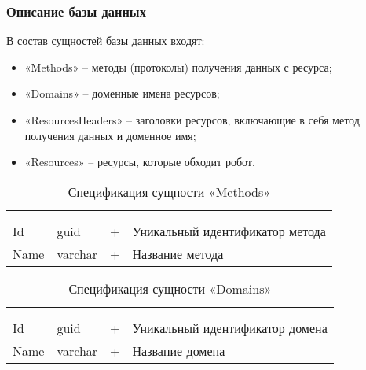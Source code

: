 \subsubsection{Описание базы данных}

В состав сущностей базы данных входят:
\begin{itemize}
\item «Methods» -- методы (протоколы) получения данных с ресурса;
\item «Domains» -- доменные имена ресурсов;
\item «ResourcesHeaders» -- заголовки ресурсов, включающие в себя метод получения данных и доменное имя;
\item «Resources» -- ресурсы, которые обходит робот.
\end{itemize}

\begin{xltabular}{\textwidth}{|X|X|X|X|}
	\caption{Спецификация сущности «Methods»}\label{crawler_methods:table}\\ \hline
	 &  &  &  \\ \hline
	 &  &  &  \\ \hline
	\endfirsthead
	 \hline
	 &  &  &  \\ \hline
	\endhead
	Id & guid & + & Уникальный идентификатор метода \\ \hline
	Name & varchar & + & Название метода \\ \hline
\end{xltabular}

\begin{xltabular}{\textwidth}{|X|X|X|X|}
	\caption{Спецификация сущности «Domains»}\label{crawler_domains:table}\\ \hline
	 &  &  &  \\ \hline
	 &  &  &  \\ \hline
	\endfirsthead
	 \hline
	 &  &  &  \\ \hline
	\endhead
	Id & guid & + & Уникальный идентификатор домена \\ \hline
	Name & varchar & + & Название домена \\ \hline
\end{xltabular}

